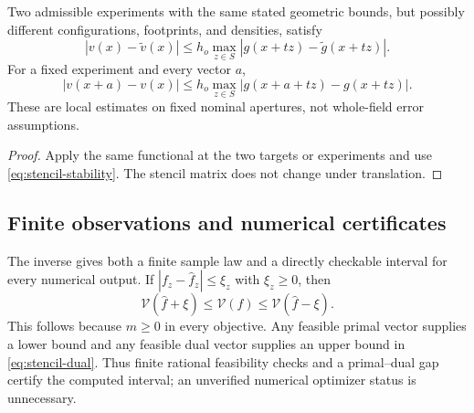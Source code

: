 \begin{corollary}
\label{cor:stencil-local-stability}
Two admissible experiments with the same stated geometric bounds,
but possibly different configurations, footprints, and densities,
satisfy
\begin{equation}\label{eq:stencil-local-stability}
 |v(x)-\widetilde v(x)|
       \le h_o\max_{z\in S}|g(x+tz)-\widetilde g(x+tz)|.
\end{equation}
For a fixed experiment and every vector $a$,
\begin{equation}\label{eq:stencil-period-defect}
 |v(x+a)-v(x)|
       \le h_o\max_{z\in S}|g(x+a+tz)-g(x+tz)|.
\end{equation}
These are local estimates on fixed nominal apertures, not whole-field
error assumptions.
\end{corollary}
\begin{proof}
Apply the same functional at the two targets or experiments and use
\eqref{eq:stencil-stability}. The stencil matrix does not change under
translation.
\end{proof}

\subsection{Finite observations and numerical certificates}
The inverse gives both a finite sample law and a directly checkable
interval for every numerical output. If
$|f_z-\widehat f_z|\le\xi_z$ with $\xi_z\ge0$, then
\begin{equation}\label{eq:stencil-certified-interval}
 \mathcal V(\widehat f+\xi)\le\mathcal V(f)
                      \le\mathcal V(\widehat f-\xi).
\end{equation}
This follows because $m\ge0$ in every objective. Any feasible primal
vector supplies a lower bound and any feasible dual vector supplies
an upper bound in \eqref{eq:stencil-dual}. Thus finite rational
feasibility checks and a primal--dual gap certify the computed interval;
an unverified numerical optimizer status is unnecessary.

